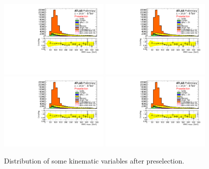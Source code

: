 \begin{figure}[p]
     \begin{center}
            \includegraphics[page=5,width=0.47\textwidth]{figure/std_plots_presel.pdf}
            \includegraphics[page=7,width=0.47\textwidth]{figure/std_plots_presel.pdf}
            \includegraphics[page=2,width=0.47\textwidth]{figure/std_plots_presel.pdf}
            \includegraphics[page=4,width=0.47\textwidth]{figure/std_plots_presel.pdf}

    \end{center}
    \caption{Distribution of some kinematic variables after preselection.}
   \label{fig:validation}
\end{figure}



